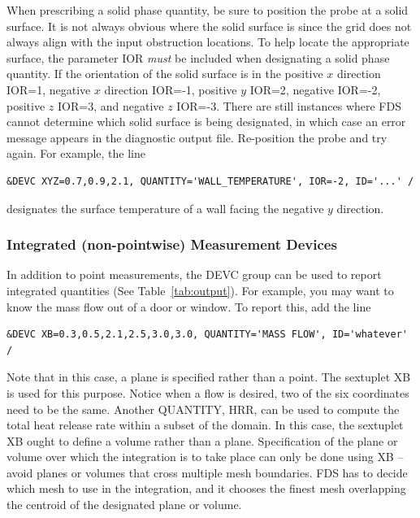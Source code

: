 \documentclass[11pt]{book}
\begin{document}
When prescribing a solid phase quantity, be sure to position the
probe at a solid surface. It is not always obvious where the
solid surface is since the grid does not always align with the input obstruction
locations. To help locate the appropriate surface, the parameter {\ct IOR} {\em must} be included
when designating a solid phase quantity.
If the orientation of the solid surface is in the
positive $x$ direction {\ct IOR=1}, negative $x$ direction {\ct IOR=-1},
positive $y$ {\ct IOR=2}, negative {\ct IOR=-2}, positive $z$ {\ct IOR=3},
and negative $z$ {\ct IOR=-3}. There are still instances where FDS cannot
determine which solid surface is being designated, in which case an
error message appears in the diagnostic output file.
Re-position the probe and try again. For example, the line

\footnotesize
\begin{verbatim}
&DEVC XYZ=0.7,0.9,2.1, QUANTITY='WALL_TEMPERATURE', IOR=-2, ID='...' /
\end{verbatim}
\normalsize

\noindent
designates the surface temperature of a wall facing the negative $y$
direction.



\subsubsection{Integrated (non-pointwise) Measurement Devices}

In addition to point measurements, the {\ct DEVC} group can be used
to report integrated quantities (See Table~\ref{tab:output}).
For example, you may want to know the mass flow out of a door or window.
To report this, add the line

\footnotesize
\begin{verbatim}
&DEVC XB=0.3,0.5,2.1,2.5,3.0,3.0, QUANTITY='MASS FLOW', ID='whatever' /
\end{verbatim}
\normalsize

\noindent
Note that in this case, a plane is specified rather than
a point. The sextuplet {\ct XB} is used for this purpose. Notice when a
flow is desired, two of the six coordinates need to be the same. Another
{\ct QUANTITY}, {\ct HRR}, can be used to compute the total heat release
rate within a subset of the domain. In this case, the sextuplet
{\ct XB} ought to define a volume rather than a plane. Specification of
the plane or volume over which the integration is to take place can only
be done using {\ct XB} -- avoid planes or volumes
that cross multiple mesh boundaries. FDS has to decide which mesh to
use in the integration, and it chooses the finest mesh overlapping
the centroid of the designated plane or volume.
\end{document}

